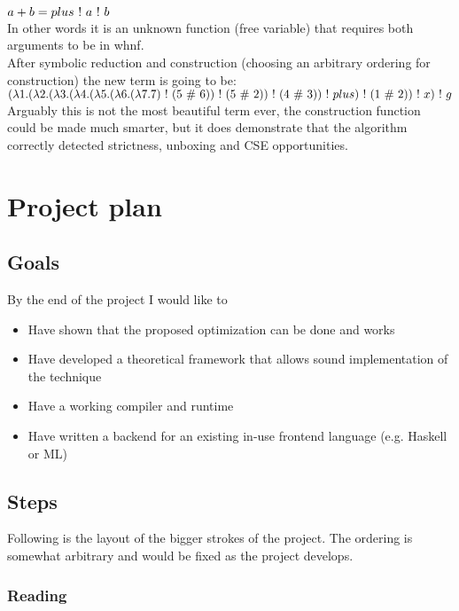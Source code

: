 \documentclass[a4paper]{article}
\begin{document}
$a + b = plus \ !\  a \ !\  b$\\

In other words it is an unknown function (free variable) that requires both arguments to be in whnf.\\

After symbolic reduction and construction (choosing an arbitrary ordering for construction) the new term is going to be:\\

$(\lambda 1.(\lambda 2.(\lambda 3.(\lambda 4.(\lambda 5.(\lambda 6.(\lambda 7.7) \ !\  (5 \ \#\  6)) \ !\  (5 \ \#\  2)) \ !\  (4 \ \#\  3)) \ !\  plus) \ !\  (1 \ \#\  2)) \ !\  x) \ !\  g$\\

Arguably this is not the most beautiful term ever, the construction function could be made much smarter, but it does demonstrate that the algorithm correctly detected strictness, unboxing and CSE opportunities.

\section{Project plan}

\subsection{Goals}

By the end of the project I would like to

\begin{itemize}
\item Have shown that the proposed optimization can be done and works
\item Have developed a theoretical framework that allows sound implementation of the technique
\item Have a working compiler and runtime
\item Have written a backend for an existing in-use frontend language (e.g. Haskell or ML)
\end{itemize}

\subsection{Steps}

Following is the layout of the bigger strokes of the project. The ordering is somewhat arbitrary and would be fixed as the project develops.

\subsubsection*{Reading}
\end{document}
